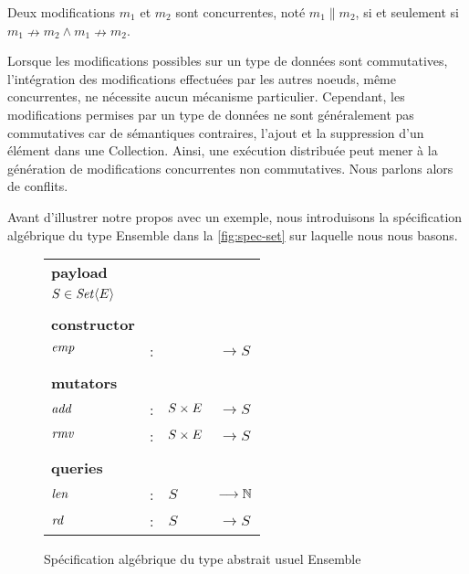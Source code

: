 \begin{definition}[Concurrence]
  Deux modifications $m_1$ et $m_2$ sont concurrentes, noté $m_1 \parallel m_2$, si et seulement si $m_1 \nrightarrow m_2 \land m_1 \nrightarrow m_2$.
\end{definition}

Lorsque les modifications possibles sur un type de données sont commutatives, l'intégration des modifications effectuées par les autres noeuds, même concurrentes, ne nécessite aucun mécanisme particulier.
Cependant, les modifications permises par un type de données ne sont généralement pas commutatives car de sémantiques contraires, \eg l'ajout et la suppression d'un élément dans une Collection.
Ainsi, une exécution distribuée peut mener à la génération de modifications concurrentes non commutatives.
Nous parlons alors de conflits.

Avant d'illustrer notre propos avec un exemple, nous introduisons la spécification algébrique du type Ensemble dans la \autoref{fig:spec-set} sur laquelle nous nous basons.

\begin{figure}[!ht]

  \centering
    \begin{tabular}{llll}
      \textbf{payload} \\
      $S \in \mathit{Set}\langle E \rangle$ & & & \\
      \\
      \textbf{constructor} \\
      $\mathit{emp}$ & : &                       & $\longrightarrow S$   \\
      \\
      \textbf{mutators} \\
      $\mathit{add}$ & : & $S \times E$ & $\longrightarrow S$   \\
      $\mathit{rmv}$ & : & $S \times E$          & $\longrightarrow S$   \\
      \\
      \textbf{queries} \\
      $\mathit{len}$ & : & $S$                   & $\longrightarrow \mathbb{N}$   \\
      $\mathit{rd}$  & : & $S$                   & $\longrightarrow S$ \\
    \end{tabular}
  \caption{Spécification algébrique du type abstrait usuel Ensemble}
  \label{fig:spec-set}
\end{figure}

